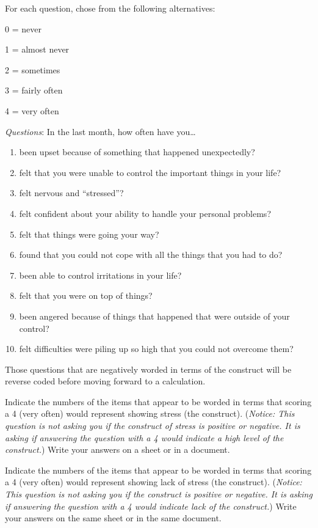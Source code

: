 \documentclass[
]{book}
\begin{document}
For each question, chose from the following alternatives:

0 = never

1 = almost never

2 = sometimes

3 = fairly often

4 = very often

\emph{Questions}: In the last month, how often have you\ldots{}

\begin{enumerate}
\def\labelenumi{\arabic{enumi}.}
\item
  been upset because of something that happened unexpectedly?
\item
  felt that you were unable to control the important things in your life?
\item
  felt nervous and ``stressed''?
\item
  felt confident about your ability to handle your personal problems?
\item
  felt that things were going your way?
\item
  found that you could not cope with all the things that you had to do?
\item
  been able to control irritations in your life?
\item
  felt that you were on top of things?
\item
  been angered because of things that happened that were outside of your control?
\item
  felt difficulties were piling up so high that you could not overcome them?
\end{enumerate}

Those questions that are negatively worded in terms of the construct will be reverse coded before moving forward to a calculation.

Indicate the numbers of the items that appear to be worded in terms that scoring a 4 (very often) would represent showing stress (the construct). (\emph{Notice: This question is not asking you if the construct of stress is positive or negative. It is asking if answering the question with a 4 would indicate a high level of the construct.}) Write your answers on a sheet or in a document.

Indicate the numbers of the items that appear to be worded in terms that scoring a 4 (very often) would represent showing lack of stress (the construct). (\emph{Notice: This question is not asking you if the construct is positive or negative. It is asking if answering the question with a 4 would indicate lack of the construct.}) Write your answers on the same sheet or in the same document.
\end{document}
